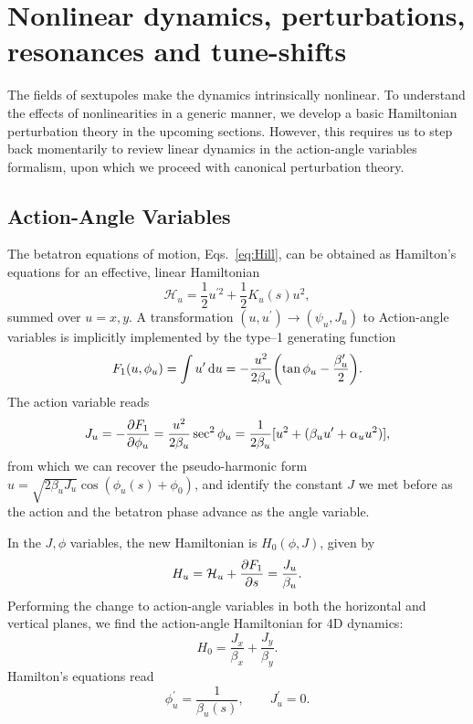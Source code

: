 \section{Nonlinear dynamics, perturbations, resonances and tune-shifts}
The fields of sextupoles make the dynamics intrinsically nonlinear. To understand the effects of nonlinearities in a generic manner, we develop a basic Hamiltonian perturbation theory in the upcoming sections. However, this requires us to step back momentarily to review linear dynamics in the action-angle variables formalism, upon which we proceed with canonical perturbation theory.
\subsection{Action-Angle Variables}
The betatron equations of motion, Eqs.~\eqref{eq:Hill}, can be obtained as Hamilton's equations for an effective, linear Hamiltonian
\begin{equation}
    \mathcal{H}_u=\frac{1}{2}u^{\prime2}+\frac{1}{2}K_u(s)u^2,
\end{equation}
summed over $u=x,y$.
A transformation $(u,u^\prime)\to(\psi_u, J_u)$ to Action-angle variables is implicitly implemented by the type--1 generating function \cite{lee_accelerator_2004}
\begin{equation}
    F_1(u,\phi_u)=\int{u}^\prime\dd{{u}}=-\frac{u^2}{2\beta_u}\qty(\tan \phi_u-\frac{\beta_u^\prime}{2}).
\end{equation}
The action variable reads
\begin{equation}
    J_u=-\pdv{F_1}{\phi_u} = \frac{u^2}{2\beta_u}\sec^2\phi_u = \frac{1}{2\beta_u}[u^2 + (\beta_u u^\prime + \alpha_u u^2)],
    \label{eq:action}
\end{equation}
from which we can recover the pseudo-harmonic form $u=\sqrt{2\beta_u J_u}\cos(\phi_u(s)+\phi_0)$, and identify the constant $J$ we met before as the action and the betatron phase advance as the angle variable.

In the $J,\phi$ variables, the new Hamiltonian is $H_0(\phi, J)$,  given by
\begin{equation}
    H_u=\mathcal{H}_u+\pdv{F_1}{s} = \frac{J_u}{\beta_u}.
\end{equation}
Performing the change to action-angle variables in both the horizontal and vertical planes, we find the action-angle Hamiltonian for 4D dynamics:
\begin{equation}
    H_0= \frac{J_x}{\beta_x} +  \frac{J_y}{\beta_y}.
\end{equation}
Hamilton's equations read
\begin{equation}
    \phi_u^\prime = \frac{1}{\beta_u(s)},\qquad J_u^\prime=0.
\end{equation}
